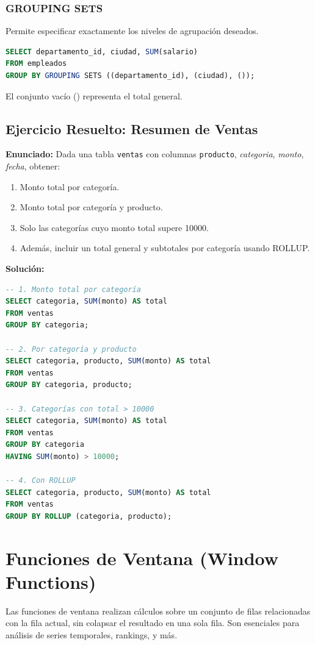 \documentclass[12pt,a4paper,openany,oneside]{book}
\begin{document}
\subsection{GROUPING SETS}
Permite especificar exactamente los niveles de agrupación deseados.
\begin{lstlisting}[language=SQL]
SELECT departamento_id, ciudad, SUM(salario)
FROM empleados
GROUP BY GROUPING SETS ((departamento_id), (ciudad), ());
\end{lstlisting}
El conjunto vacío () representa el total general.

\section{Ejercicio Resuelto: Resumen de Ventas}
\textbf{Enunciado:} Dada una tabla \texttt{ventas} con columnas \texttt{producto}, \textit{categoria}, \textit{monto}, \textit{fecha}, obtener:
\begin{enumerate}
    \item Monto total por categoría.
    \item Monto total por categoría y producto.
    \item Solo las categorías cuyo monto total supere 10000.
    \item Además, incluir un total general y subtotales por categoría usando ROLLUP.
\end{enumerate}
\textbf{Solución:}
\begin{lstlisting}[language=SQL]
-- 1. Monto total por categoría
SELECT categoria, SUM(monto) AS total
FROM ventas
GROUP BY categoria;

-- 2. Por categoría y producto
SELECT categoria, producto, SUM(monto) AS total
FROM ventas
GROUP BY categoria, producto;

-- 3. Categorías con total > 10000
SELECT categoria, SUM(monto) AS total
FROM ventas
GROUP BY categoria
HAVING SUM(monto) > 10000;

-- 4. Con ROLLUP
SELECT categoria, producto, SUM(monto) AS total
FROM ventas
GROUP BY ROLLUP (categoria, producto);
\end{lstlisting}

\chapter{Funciones de Ventana (Window Functions)}
Las funciones de ventana realizan cálculos sobre un conjunto de filas relacionadas con la fila actual, sin colapsar el resultado en una sola fila. Son esenciales para análisis de series temporales, rankings, y más.
\end{document}
